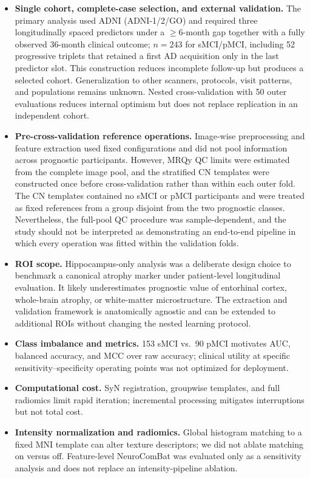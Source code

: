 \documentclass[review]{elsarticle}
\begin{document}
	\begin{itemize}
		\item \textbf{Single cohort, complete-case selection, and external validation.} The primary analysis used ADNI (ADNI-1/2/GO) and required three longitudinally spaced predictors under a $\geq6$-month gap together with a fully observed 36-month clinical outcome; $n=243$ for sMCI/pMCI, including 52 progressive triplets that retained a first AD acquisition only in the last predictor slot. This construction reduces incomplete follow-up but produces a selected cohort. Generalization to other scanners, protocols, visit patterns, and populations remains unknown. Nested cross-validation with 50 outer evaluations reduces internal optimism but does not replace replication in an independent cohort.
		\item \textbf{Pre-cross-validation reference operations.} Image-wise preprocessing and feature extraction used fixed configurations and did not pool information across prognostic participants. However, MRQy QC limits were estimated from the complete image pool, and the stratified CN templates were constructed once before cross-validation rather than within each outer fold. The CN templates contained no sMCI or pMCI participants and were treated as fixed references from a group disjoint from the two prognostic classes. Nevertheless, the full-pool QC procedure was sample-dependent, and the study should not be interpreted as demonstrating an end-to-end pipeline in which every operation was fitted within the validation folds.
		\item \textbf{ROI scope.} Hippocampus-only analysis was a deliberate design choice to benchmark a canonical atrophy marker under patient-level longitudinal evaluation. It likely underestimates prognostic value of entorhinal cortex, whole-brain atrophy, or white-matter microstructure. The extraction and validation framework is anatomically agnostic and can be extended to additional ROIs without changing the nested learning protocol.
		\item \textbf{Class imbalance and metrics.} 153 sMCI vs.\ 90 pMCI motivates AUC, balanced accuracy, and MCC over raw accuracy; clinical utility at specific sensitivity--specificity operating points was not optimized for deployment.
		\item \textbf{Computational cost.} SyN registration, groupwise templates, and full radiomics limit rapid iteration; incremental processing mitigates interruptions but not total cost.
		\item \textbf{Intensity normalization and radiomics.} Global histogram matching to a fixed MNI template can alter texture descriptors; we did not ablate matching on versus off. Feature-level NeuroComBat was evaluated only as a sensitivity analysis and does not replace an intensity-pipeline ablation.

\end{itemize}
\end{document}
